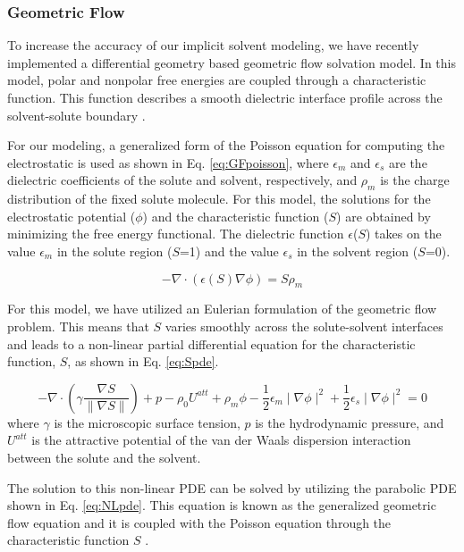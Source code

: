\documentclass[journal=jpcbfk, manuscript=article]{achemso}
\begin{document}
\subsubsection{Geometric Flow}
To increase the accuracy of our implicit solvent modeling, we have recently implemented a differential geometry based geometric flow solvation model. In this model, polar and nonpolar free energies are coupled through a characteristic function. This function describes a smooth dielectric interface profile across the solvent-solute boundary \cite{thomas2013}. 

For our modeling, a generalized form of the Poisson equation for computing the electrostatic is used as shown in Eq. \ref{eq:GFpoisson}, where $\epsilon_m$ and $\epsilon_s$ are the dielectric coefficients of the solute and solvent, respectively, and $\rho_m$ is the charge distribution of the fixed solute molecule. For this model, the solutions for the electrostatic potential ($\phi$) and the characteristic function ($S$) are obtained by minimizing the free energy functional. The dielectric function $\epsilon$($S$) takes on the value $\epsilon_m$ in the solute region ($S$=1) and the value $\epsilon_s$ in the solvent region ($S$=0).

\begin{equation}\label{eq:GFpoisson}
-\nabla \cdot\left(\epsilon\left(S\right)\nabla\phi\right)=S\rho_m
\end{equation}

For this model, we have utilized an Eulerian formulation of the geometric flow problem. This means that $S$ varies smoothly across the solute-solvent interfaces and leads to a non-linear partial differential equation for the characteristic function, $S$, as shown in Eq. \ref{eq:Spde}.

\begin{equation}\label{eq:Spde}
-\nabla\cdot\left(\gamma\frac{\nabla S}{\parallel\nabla S\parallel}\right)+p-\rho_0U^{att}+\rho_m\phi - \frac{1}{2}\epsilon_m\mid\nabla\phi\mid^2+\frac{1}{2}\epsilon_s\mid\nabla\phi\mid^2=0
\end{equation}
where $\gamma$ is the microscopic surface tension, $p$ is the hydrodynamic pressure, and $U^{att}$ is the attractive potential of the van der Waals dispersion interaction between the solute and the solvent.

The solution to this non-linear PDE can be solved by utilizing the parabolic PDE shown in Eq. \ref{eq:NLpde}. This equation is known as the generalized geometric flow equation and it is coupled with the Poisson equation through the characteristic function $S$ \cite{chen2010}.
\end{document}
